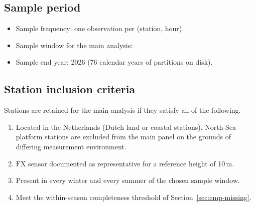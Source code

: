 \subsection{Sample period}\label{sec:emp-sample}

\begin{itemize}
    \item Sample frequency: one observation per (station, hour).
    \item Sample window for the main analysis:
    \item Sample end year: 2026 (76 calendar years of partitions
          on disk).
\end{itemize}

\subsection{Station inclusion criteria}\label{sec:emp-stations}

Stations are retained for the main analysis if they satisfy all of
the following.

\begin{enumerate}
    \item Located in the Netherlands (Dutch land or coastal
          stations). North-Sea platform stations are excluded from
          the main panel on the grounds of differing measurement
          environment.
    \item \(\mathrm{FX}\) sensor documented as representative for
          a reference height of 10\,m.
    \item Present in every winter and every summer of the chosen
          sample window.
    \item Meet the within-season completeness threshold of
          Section~\ref{sec:emp-missing}.
\end{enumerate}

